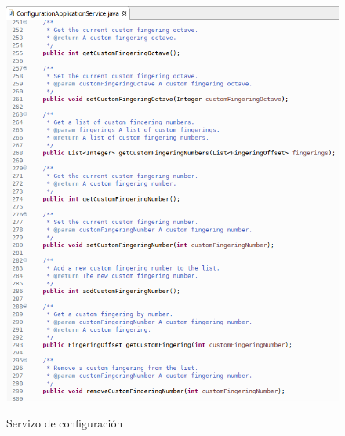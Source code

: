    \begin{figure}[htbp]
    \centering
    \includegraphics[scale=0.6, keepaspectratio=true]{./imagenes/servizo-configuracion-6.png} \\
    \caption{Servizo de configuración}
    \label{figura:ServizoConfiguracion6}
   \end{figure}
   
